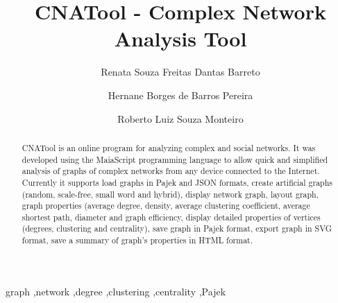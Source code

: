 \documentclass[preprint,12pt, a4paper]{elsarticle}
\begin{document}
\begin{frontmatter}



\title{CNATool - Complex Network Analysis Tool}


\author[cimatec]{Renata Souza Freitas Dantas Barreto}
\author[cimatec]{Hernane Borges de Barros Pereira}
\author[cimatec]{Roberto Luiz Souza Monteiro}
\address[cimatec]{SENAI CIMATEC University Center\\Av. Orlando Gomes, 1845,\\Piat\~{a},\\Salvador - BA,\\41650-010}

\begin{abstract}
CNATool is an online program for analyzing complex and social networks.
It was developed using the MaiaScript programming language to allow
quick and simplified analysis of graphs of complex networks
from any device connected to the Internet. Currently it supports load graphs
in Pajek and JSON formats, create artificial graphs (random, scale-free,
small word and hybrid), display network graph, layout graph,
graph properties (average degree, density, average clustering coefficient,
average shortest path, diameter and graph efficiency, display detailed properties of
vertices (degrees, clustering and centrality), save graph in Pajek format,
export graph in SVG format, save a summary of graph’s properties in HTML format.
\end{abstract}

\begin{keyword}
graph \sep network \sep degree \sep clustering \sep centrality \sep Pajek



\end{keyword}

\end{frontmatter}
\end{document}
